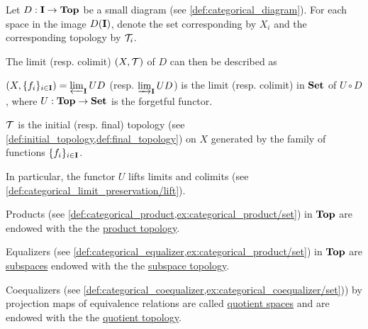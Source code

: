 \begin{proposition}\label{thm:initial_final_topology_limit}\cite{nLab:top}
  Let $D: \operatorname{\mathbf{I}} \to \operatorname{\mathbf{Top}}$ be a small diagram (see \cref{def:categorical_diagram}). For each space in the image $D(\operatorname{\mathbf{I}})$, denote the set corresponding by $X_i$ and the corresponding topology by $\mathcal T_i$.

  The limit (resp. colimit) $(X, \mathcal T)$ of $D$ can then be described as
  \begin{defenum}
    \item $(X, \{ f_i \}_{i \in \operatorname{\mathbf{I}}}) = \varprojlim_{\operatorname{\mathbf{I}}} UD$ (resp. $\varinjlim_{\operatorname{\mathbf{I}}} UD$) is the limit (resp. colimit) in $\operatorname{\mathbf{Set}}$ of $U \circ D$, where $U: \operatorname{\mathbf{Top}} \to \operatorname{\mathbf{Set}}$ is the forgetful functor.
    \item $\mathcal T$ is the initial (resp. final) topology (see \cref{def:initial_topology,def:final_topology}) on $X$ generated by the family of functions $\{ f_i \}_{i \in \operatorname{\mathbf{I}}}$.
  \end{defenum}

  In particular, the functor $U$ lifts limits and colimits (see \cref{def:categorical_limit_preservation/lift}).
\end{proposition}

\begin{example}\label{ex:initial_final_topology}\cite{nLab:top}
  \begin{defenum}
    \item Products (see \cref{def:categorical_product,ex:categorical_product/set}) in $\operatorname{\mathbf{Top}}$ are endowed with the the \uline{product topology}.
    \item Equalizers (see \cref{def:categorical_equalizer,ex:categorical_product/set}) in $\operatorname{\mathbf{Top}}$ are \uline{subspaces} endowed with the the \uline{subspace topology}.
    \item Coequalizers (see \cref{def:categorical_coequalizer,ex:categorical_coequalizer/set})) by projection maps of equivalence relations are called \uline{quotient spaces} and are endowed with the the \uline{quotient topology}.
  \end{defenum}
\end{example}
